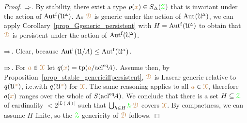 \begin{proof} 
  $\IMP$.
  By stability, there exist a type $p({\mr x})\in S_\Delta(\grZ)$ that is invariant under the action of $\Autf(\UDelta)$.
  As $\mrD$ is generic under the action of $\Aut(\UDelta)$, we can apply Corollary~\ref{prop_Ggeneric_persistent} with $H=\Autf(\UDelta)$ to obtain that $\mrD$ is persistent under the action of $\Autf(\UDelta)$.

  $\IMP$. Clear, because $\Autf(\U/A)\le\Autf(\UDelta)$.

  $\IMP$.
  For ${\mr a}\in\mrX$ let $q({\mr x})=\tp({\mr a}/\acl^\eq\!A)$.
  Assume  then, by Proposition~\ref{prop_stable_genericiffpersistent}, $\mrD$ is Lascar generic relative to $q(\U^{\mr x})$, i.e.\@ with $q(\U^{\mr x})$ for $\mrX$.
  The same reasoning applies to all ${\mr a}\in\mrX$, therefore $q({\mr x})$ ranges over the whole of $S(\acl^\eq\!A)$.
  We conclude that there is a set $H\subseteq\grZ$ of cardinality $<2^{|L(A)|}$ such that $\bigcup_{h\in H}{\gr h}{\cdot}\mrD$ covers $\mrX$.
  By compactness, we can assume $H$ finite, so the $\grZ$-genericity of $\mrD$ follows.
\end{proof}

